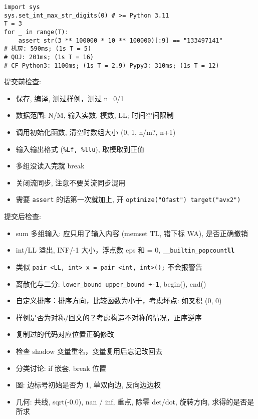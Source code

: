 \begin{small}
\begin{itemize}[leftmargin=1mm]
\begin{verbatim}
\end{verbatim}
\begin{verbatim}
import sys
sys.set_int_max_str_digits(0) # >= Python 3.11 
T = 3
for _ in range(T):
    assert str(3 ** 100000 * 10 ** 100000)[:9] == "133497141"
# 机房: 590ms; (1s T = 5)
# QOJ: 201ms; (1s T = 16)
# CF Python3: 1100ms; (1s T = 2.9) Pypy3: 310ms; (1s T = 12)
\end{verbatim}
\end{itemize}
提交前检查: 
\begin{itemize}[leftmargin=1mm]
    \setlength{\itemsep}{0pt}
    \setlength{\parskip}{0.5pt}
\item 保存, 编译, 测过样例，测过 n=0/1
\item 数据范围: N/M, 输入实数, 模数, LL; 时间空间限制
\item 调用初始化函数, 清空时数组大小 (0, 1, n/m?, n+1)
\item 输入输出格式 (\texttt{\%Lf, \%llu}), 取模取到正值
\item 多组没读入完就 break
\item 关闭流同步, 注意不要关流同步混用
\item 需要 \texttt{assert} 的话第一次就加上, 开 \texttt{optimize("Ofast") target("avx2")}
\end{itemize}
提交后检查:
\begin{itemize}[leftmargin=1mm]
\setlength{\itemsep}{0pt}
\setlength{\parskip}{0.5pt}
\item sum 多组输入: 应只用了输入内容 (memset TL, 错下标 WA), 是否正确撤销
\item int/LL 溢出, INF/-1 大小，浮点数 eps 和 = 0, \texttt{\_\_builtin\_popcount\textbf{ll}}
\item 类似 \texttt{pair <LL, int> x = pair <int, int>();} 不会报警告 
\item 离散化与二分: \texttt{lower\_bound upper\_bound +-1}, begin(), end()
\item 自定义排序：排序方向，比较函数为小于，考虑坏点: 如叉积 (0, 0)
\item 样例是否为对称/回文的？考虑构造不对称的情况，正序逆序
\item 复制过的代码对应位置正确修改
\item 检查 shadow 变量重名，变量复用后忘记改回去
\item 分类讨论: if 嵌套, break 位置
\item 图: 边标号初始是否为 1, 单双向边, 反向边边权
\item 几何: 共线, sqrt(-0.0), nan / inf, 重点, 除零 det/dot, 旋转方向, 求得的是否是所求
\end{itemize}
\end{small}
